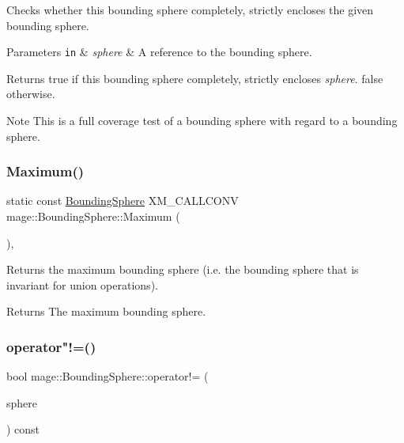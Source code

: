 Checks whether this bounding sphere completely, strictly encloses the given bounding sphere.


\begin{DoxyParams}[1]{Parameters}
\mbox{\tt in}  & {\em sphere} & A reference to the bounding sphere. \\
\hline
\end{DoxyParams}
\begin{DoxyReturn}{Returns}
{\ttfamily true} if this bounding sphere completely, strictly encloses {\itshape sphere}. {\ttfamily false} otherwise. 
\end{DoxyReturn}
\begin{DoxyNote}{Note}
This is a full coverage test of a bounding sphere with regard to a bounding sphere. 
\end{DoxyNote}
\hypertarget{classmage_1_1_bounding_sphere_afbdb210289e14ceeb69d62d1d0585b93}{}\label{classmage_1_1_bounding_sphere_afbdb210289e14ceeb69d62d1d0585b93} 
\subsubsection{\texorpdfstring{Maximum()}{Maximum()}}
{\footnotesize\ttfamily static const \hyperlink{classmage_1_1_bounding_sphere}{Bounding\+Sphere} X\+M\+\_\+\+C\+A\+L\+L\+C\+O\+NV mage\+::\+Bounding\+Sphere\+::\+Maximum (\begin{DoxyParamCaption}{ }\end{DoxyParamCaption})\hspace{0.3cm}{\ttfamily [static]}, {\ttfamily [noexcept]}}

Returns the maximum bounding sphere (i.\+e. the bounding sphere that is invariant for union operations).

\begin{DoxyReturn}{Returns}
The maximum bounding sphere. 
\end{DoxyReturn}
\hypertarget{classmage_1_1_bounding_sphere_a841979aaee8a82784674296801aa5fbc}{}\label{classmage_1_1_bounding_sphere_a841979aaee8a82784674296801aa5fbc} 
\subsubsection{\texorpdfstring{operator"!=()}{operator!=()}}
{\footnotesize\ttfamily bool mage\+::\+Bounding\+Sphere\+::operator!= (\begin{DoxyParamCaption}\item[{const \hyperlink{classmage_1_1_bounding_sphere}{Bounding\+Sphere} \&}]{sphere }\end{DoxyParamCaption}) const\hspace{0.3cm}{\ttfamily [noexcept]}}

